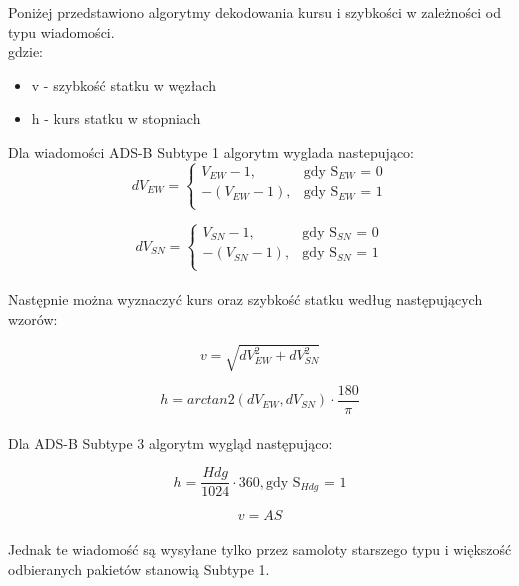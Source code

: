 \documentclass[eng,printmode]{mgr}
\begin{document}
Poniżej przedstawiono algorytmy dekodowania kursu i szybkości w zależności od typu wiadomości.
\\

\noindent
gdzie:
\begin{itemize}
\item v - szybkość statku w węzłach
\item h - kurs statku w stopniach
\end{itemize}

\noindent
Dla wiadomości ADS-B Subtype 1 algorytm wyglada nastepująco:
\begin{equation}
\renewcommand*{\arraystretch}{1.3}
dV_{EW}= \left\{ \begin{array}{ll}
V_{EW} - 1, & \textrm{gdy S$_{EW}$ = 0}\\
-(V_{EW} - 1), & \textrm{gdy S$_{EW}$ = 1}\\
\end{array} \right.
\end{equation}

\begin{equation}
\renewcommand*{\arraystretch}{1.3}
dV_{SN}= \left\{ \begin{array}{ll}
V_{SN} - 1, & \textrm{gdy S$_{SN}$ = 0}\\
-(V_{SN} - 1), & \textrm{gdy S$_{SN}$ = 1}\\
\end{array} \right.
\end{equation}
\\
\noindent
Następnie można wyznaczyć kurs oraz szybkość statku według następujących wzorów:

\begin{equation}
v = \sqrt{dV_{EW}^2 + dV_{SN}^2}
\end{equation}

\begin{equation}
h = arctan2(dV_{EW},dV_{SN}) \cdot \frac{180}{\pi}
\end{equation}
\\
\noindent
Dla ADS-B Subtype 3 algorytm wygląd następująco:

\begin{equation}
h = \frac{Hdg}{1024} \cdot 360, \textrm{gdy S$_{Hdg}$ = 1}
\end{equation}

\begin{equation}
v = AS
\end{equation}
\\


Jednak te wiadomość są wysyłane tylko przez samoloty starszego typu i większość odbieranych pakietów stanowią Subtype 1.
\end{document}
